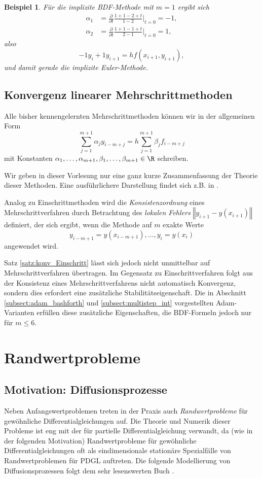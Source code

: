 \documentclass[
]{mycourse}
\theoremstyle{mythm}
\newtheorem{beispiel}[theorem]{Beispiel}
\theoremstyle{break}
\newcommand{\norm}[1]{\left\Vert#1\right\Vert}		%
\begin{document}
\begin{beispiel}
Für die implizite BDF-Methode mit $m=1$ ergibt sich
\begin{align*}
\alpha_1 &=  \frac{\partial}{\partial t}  
 \frac{1+1-2+t}{1-2}\Big|_{t=0}=-1,\\
\alpha_2 &=\frac{\partial}{\partial t}  
 \frac{1+1-1+t}{2-1}\Big|_{t=0}=1,
\end{align*}
also 
\[
-1 y_i + 1y_{i+1} = hf(x_{i+1},y_{i+1}),
\]
und damit gerade die implizite Euler-Methode.
\end{beispiel}

\subsection{Konvergenz linearer Mehrschrittmethoden}

Alle bisher kennengelernten Mehrschrittmethoden können wir in der allgemeinen Form
\[
\sum_{j=1}^{m+1} \alpha_j  y_{i-m+j} = h \sum_{j=1}^{m+1} \beta_j  f_{i-m+j}
\]
mit Konstanten $\alpha_1,\ldots,\alpha_{m+1},\beta_1,\ldots,\beta_{m+1}\in \R$ schreiben.

Wir geben in dieser Vorlesung nur eine ganz kurze Zusammenfassung der Theorie dieser Methoden.
Eine ausführlichere Darstellung findet sich z.B. in \cite{HairerNorsettWanner}.

Analog zu Einschrittmethoden wird die \emph{Konsistenzordnung} eines Mehrschrittverfahren
durch Betrachtung des \emph{lokalen Fehlers} $\norm{y_{i+1}-y(x_{i+1})}$
definiert, der sich ergibt, wenn die Methode
auf $m$ exakte Werte 
\[
y_{i-m+1}=y(x_{i-m+1}),\ldots,y_{i}=y(x_i)
\]
angewendet wird.

Satz \ref{satz:konv_Einschritt} lässt sich jedoch nicht unmittelbar auf Mehrschrittverfahren
übertragen. Im Gegensatz zu Einschrittverfahren folgt aus der Konsistenz eines Mehrschrittverfahrens
nicht automatisch Konvergenz, sondern dies erfordert eine zusätzliche Stabilitätseigenschaft.
Die in Abschnitt \ref{subsect:adam_bashforth} und \ref{subsect:multistep_int} vorgestellten
Adam-Varianten erfüllen diese zusätzliche Eigenschaften, die BDF-Formeln jedoch nur für
$m\leq 6$.


\section{Randwertprobleme}

\subsection{Motivation: Diffusionsprozesse}
Neben Anfangswertproblemen treten in der Praxis auch \emph{Randwertprobleme} für gewöhnliche Differentialgleichungen auf. Die Theorie und Numerik dieser Probleme ist eng mit der für partielle Differentialgleichung verwandt, da (wie in der folgenden Motivation)  Randwertprobleme für gewöhnliche Differentialgleichungen oft als eindimensionale stationäre Spezialfälle von Randwertproblemen für PDGL auftreten. Die folgende Modellierung
von Diffusionsprozessen folgt dem sehr lesenswerten Buch \cite{FulfordBroadbridge}.
\end{document}
